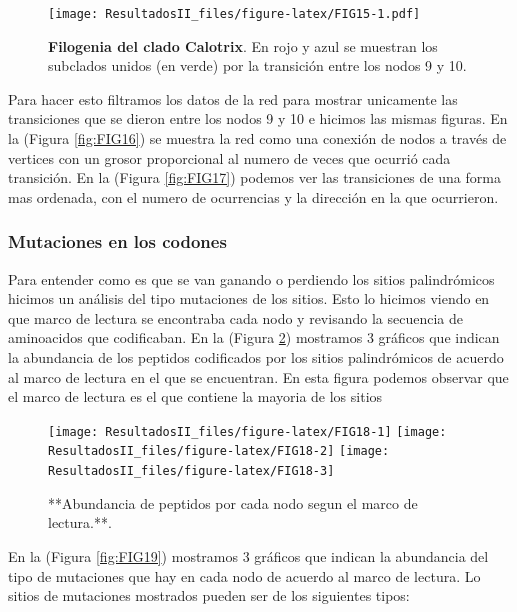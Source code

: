 \documentclass[
]{book}
\begin{document}
\begin{figure}
\centering
\texttt{[image: ResultadosII\_files/figure-latex/FIG15-1.pdf]}
\caption{\label{fig:FIG15}\textbf{Filogenia del clado Calotrix}. En rojo y azul se muestran los subclados unidos (en verde) por la transición entre los nodos 9 y 10.}
\end{figure}

Para hacer esto filtramos los datos de la red para mostrar unicamente las transiciones que se dieron entre los nodos 9 y 10 e hicimos las mismas figuras.
En la (Figura \ref{fig:FIG16}) se muestra la red como una conexión de nodos a través de vertices con un grosor proporcional al numero de veces que ocurrió cada transición. En la (Figura \ref{fig:FIG17}) podemos ver las transiciones de una forma mas ordenada, con el numero de ocurrencias y la dirección en la que ocurrieron.

\hypertarget{mutaciones-en-los-codones}{%
\subsubsection{Mutaciones en los codones}\label{mutaciones-en-los-codones}}

Para entender como es que se van ganando o perdiendo los sitios palindrómicos hicimos un análisis del tipo mutaciones de los sitios. Esto lo hicimos viendo en que marco de lectura se encontraba cada nodo y revisando la secuencia de aminoacidos que codificaban. En la (Figura \ref{fig:FIG18}) mostramos 3 gráficos que indican la abundancia de los peptidos codificados por los sitios palindrómicos de acuerdo al marco de lectura en el que se encuentran. En esta figura podemos observar que el marco de lectura es el que contiene la mayoria de los sitios

\begin{figure}

{\centering \texttt{[image: ResultadosII\_files/figure-latex/FIG18-1]} \texttt{[image: ResultadosII\_files/figure-latex/FIG18-2]} \texttt{[image: ResultadosII\_files/figure-latex/FIG18-3]} 

}

\caption{**Abundancia de peptidos por cada nodo segun el marco de lectura.**.}\label{fig:FIG18}
\end{figure}

En la (Figura \ref{fig:FIG19}) mostramos 3 gráficos que indican la abundancia del tipo de mutaciones que hay en cada nodo de acuerdo al marco de lectura. Lo sitios de mutaciones mostrados pueden ser de los siguientes tipos:
\end{document}
